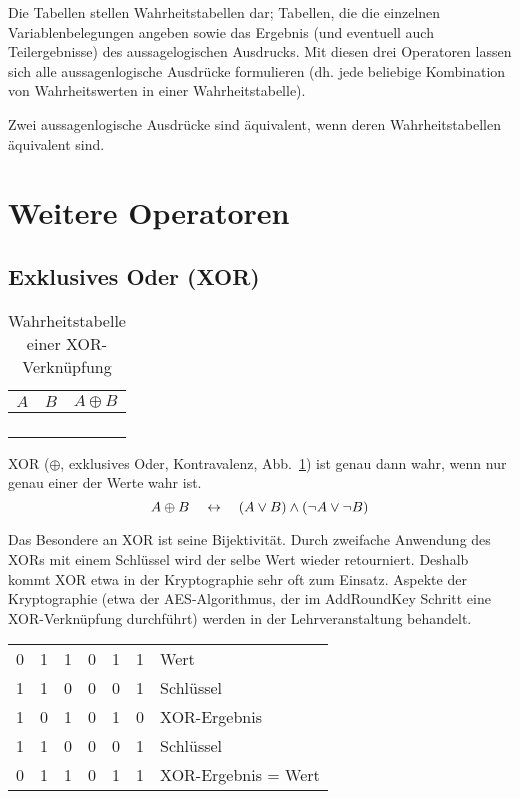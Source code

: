 Die Tabellen stellen Wahrheitstabellen dar; Tabellen, die die einzelnen Variablenbelegungen angeben sowie das Ergebnis (und eventuell auch Teilergebnisse) des aussagelogischen Ausdrucks. Mit diesen drei Operatoren lassen sich alle aussagenlogische Ausdrücke formulieren (dh. jede beliebige Kombination von Wahrheitswerten in einer Wahrheitstabelle).

Zwei aussagenlogische Ausdrücke sind äquivalent, wenn deren Wahrheitstabellen äquivalent sind.
%
\section{Weitere Operatoren}
%
\subsection{Exklusives Oder (XOR)}
%
\begin{table}[ht]
 \begin{center}
  \begin{tabular}{cc|c}
   \hline
    $A$ & $B$ & $A \oplus{} B$ \\
   \hline \hline
    \F  & \F  & \F \\
    \F  & \T  & \T \\
    \T  & \F  & \T \\
    \T  & \T  & \F \\
  \end{tabular}
  \caption{Wahrheitstabelle einer XOR-Verknüpfung}
  \label{fig:xor_operator}
 \end{center}
\end{table}
%
XOR ($\oplus$, exklusives Oder, Kontravalenz, Abb.~\ref{fig:xor_operator}) ist genau dann wahr, wenn nur genau einer der Werte wahr ist.
\[
  A \oplus B \quad\leftrightarrow\quad (A \lor B) \land (\neg A \lor \neg B)
\]

Das Besondere an XOR ist seine Bijektivität. Durch zweifache Anwendung des XORs mit einem Schlüssel wird der selbe Wert wieder retourniert. Deshalb kommt XOR etwa in der Kryptographie sehr oft zum Einsatz. Aspekte der Kryptographie (etwa der AES-Algorithmus, der im AddRoundKey Schritt eine XOR-Verknüpfung durchführt) werden in der Lehrveranstaltung \courseiis{} behandelt.
%
\begin{table}[ht]
  \begin{center}
    \begin{tabular}{cccccc|l}
      0&1&1&0&1&1& Wert \\
      1&1&0&0&0&1& Schlüssel \\
    \hline
      1&0&1&0&1&0& XOR-Ergebnis \\
      1&1&0&0&0&1& Schlüssel \\
    \hline
      0&1&1&0&1&1& XOR-Ergebnis = Wert
    \end{tabular}
  \end{center}
\end{table}


